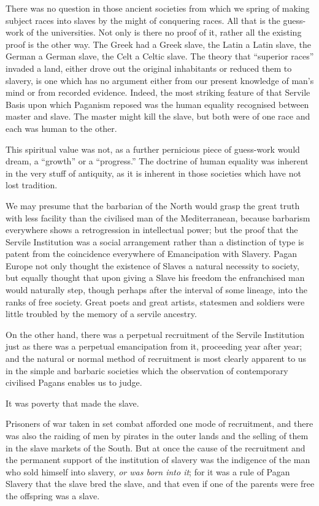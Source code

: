 \documentclass{book}
\begin{document}
There was no question in those ancient societies from which we spring of making subject races into slaves by the might of conquering races. All that is the guess-work of the universities. Not only is there no proof of it, rather all the existing proof is the other way. The Greek had a Greek slave, the Latin a Latin slave, the German a German slave, the Celt a Celtic slave. The theory that “superior races” invaded a land, either drove out the original inhabitants or reduced them to slavery, is one which has no argument either from our present knowledge of man’s mind or from recorded evidence. Indeed, the most striking feature of that Servile Basis upon which Paganism reposed was the human equality recognised between master and slave. The master might kill the slave, but both were of one race and each was human to the other.

This spiritual value was not, as a further pernicious piece of guess-work would dream, a “growth” or a “progress.” The doctrine of human equality was inherent in the very stuff of antiquity, as it is inherent in those societies which have not lost tradition.

We may presume that the barbarian of the North would grasp the great truth with less facility than the civilised man of the Mediterranean, because barbarism everywhere shows a retrogression in intellectual power; but the proof that the Servile Institution was a social arrangement rather than a distinction of type is patent from the coincidence everywhere of Emancipation with Slavery. Pagan Europe not only thought the existence of Slaves a natural necessity to society, but equally thought that upon giving a Slave his freedom the enfranchised man would naturally step, though perhaps after the interval of some lineage, into the ranks of free society. Great poets and great artists, statesmen and soldiers were little troubled by the memory of a servile ancestry.

On the other hand, there was a perpetual recruitment of the Servile Institution just as there was a perpetual emancipation from it, proceeding year after year; and the natural or normal method of recruitment is most clearly apparent to us in the simple and barbaric societies which the observation of contemporary civilised Pagans enables us to judge.

It was poverty that made the slave.

Prisoners of war taken in set combat afforded one mode of recruitment, and there was also the raiding of men by pirates in the outer lands and the selling of them in the slave markets of the South. But at once the cause of the recruitment and the permanent support of the institution of slavery was the indigence of the man who sold himself into slavery, \emph{or was born into it}; for it was a rule of Pagan Slavery that the slave bred the slave, and that even if one of the parents were free the offspring was a slave.
\end{document}
